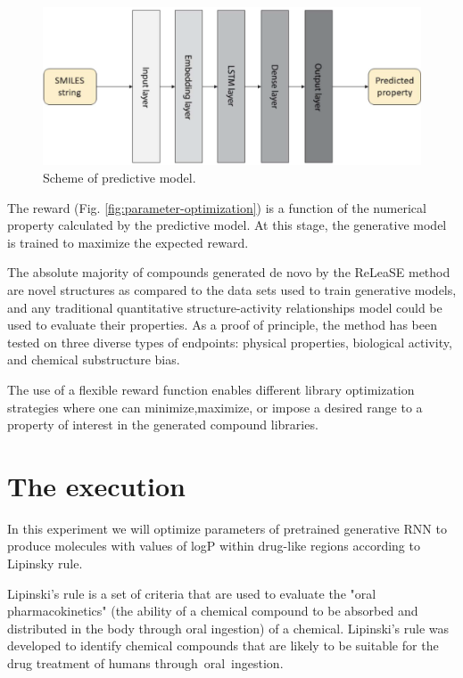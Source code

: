 \documentclass[a4paper]{article}
\begin{document}
\begin{figure}[htbp]
    \centering
        \includegraphics[width=\textwidth]{smiles-to-predicted-property.png}
    \caption{Scheme of predictive model.}
    \label{fig:smiles-to-predicted-property}
\end{figure}
	
The reward (Fig. \ref{fig:parameter-optimization}) is a function of the numerical property calculated by the predictive model. At this stage, the generative model is trained to maximize the expected reward.


The absolute majority of compounds generated de novo by the ReLeaSE method are novel structures as compared to the data sets used to train generative models, and any traditional quantitative structure-activity relationships model could be used to evaluate their properties.
As a proof of principle, the method has been tested on three diverse types of endpoints: physical properties, biological activity, and chemical substructure bias. 


The use of a flexible reward function enables different library optimization strategies where one can minimize,maximize, or impose a desired range to a property of interest in the generated compound libraries.

\section{The execution}\label{sec:The execution}

In this experiment we will optimize parameters of pretrained generative RNN to produce molecules with values of logP within drug-like regions according to Lipinsky rule. 


Lipinski's rule is a set of criteria that are used to evaluate the "oral pharmacokinetics" (the ability of a chemical compound to be absorbed and distributed in the body through oral ingestion) of a chemical. Lipinski's rule was developed to identify chemical compounds that are likely to be suitable for the drug treatment of humans through oral ingestion. 
\end{document}
